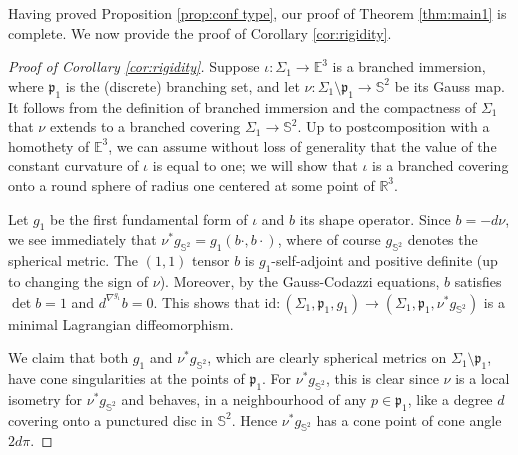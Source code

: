 \documentclass[11pt]{article}
\theoremstyle{definition}
\newcommand{\R}{{\mathbb R}}
\newcommand{\E}{\mathbb{E}}
\begin{document}
Having proved Proposition \ref{prop:conf type}, our proof of Theorem \ref{thm:main1} is complete. We now provide the proof of Corollary \ref{cor:rigidity}.

\begin{proof}[Proof of Corollary \ref{cor:rigidity}]
Suppose $\iota:\Sigma_1\to\E^3$ is a branched immersion, where $\mathfrak p_1$ is the (discrete) branching set, and let $\nu:\Sigma_1\setminus\mathfrak p_1\to\mathbb S^2$ be its Gauss map. It follows from the definition of branched immersion and the compactness of $\Sigma_1$ that $\nu$ extends to a branched covering $\Sigma_1\to\mathbb S^2$. Up to {postcomposition with a homothety of $\E^3$}, we can assume without loss of generality that the value of the constant curvature of $\iota$ is equal to one; we will show that $\iota$ is a branched covering onto a round sphere of radius one centered at some point of $\R^3$.

Let $g_1$ be the first fundamental form of $\iota$ and $b$ its shape operator. Since $b=-d\nu$, we see immediately that $\nu^*g_{\mathbb S^2}=g_1(b\cdot,b\cdot)$, where of course $g_{\mathbb S^2}$ denotes the spherical metric. The $(1,1)$ tensor $b$ is $g_1$-self-adjoint and positive definite (up to changing the sign of $\nu$). Moreover, by the Gauss-Codazzi equations, $b$ satisfies $\det b=1$ and $d^{\nabla^{g_1}}\!b=0$. This shows that $\mathrm{id}:(\Sigma_1,\mathfrak p_1,g_1)\to (\Sigma_1,\mathfrak p_1,\nu^*g_{\mathbb S^2})$ is a minimal Lagrangian diffeomorphism.

We claim that both $g_1$ and $\nu^*g_{\mathbb S^2}$, which are clearly spherical metrics on $\Sigma_1\setminus \mathfrak p_1$, have cone singularities at the points of $\mathfrak p_1$. For $\nu^*g_{\mathbb S^2}$, this is clear since $\nu$ is a local isometry for $\nu^*g_{\mathbb S^2}$ and behaves, in a neighbourhood of any $p\in\mathfrak p_1$, like a degree $d$ covering onto a punctured disc in $\mathbb S^2$. Hence $\nu^*g_{\mathbb S^2}$ has a cone point of cone angle $2d\pi$.


\end{proof}
\end{document}
